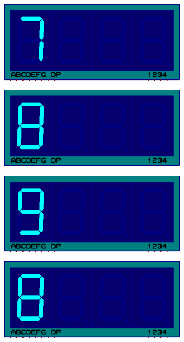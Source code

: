 \documentclass{lab_sheet}
\begin{document}
\begin{figure}[H]
\begin{subfigure}{.33\textwidth}
    \caption{}
    \label{fig:prob1-g}
  \end{subfigure}
  \begin{subfigure}{.33\textwidth}
    \centering
    \includegraphics[frame,width=.9\linewidth]{../Figures/s7}   
    \caption{}
    \label{fig:prob1-h}
  \end{subfigure}
  \begin{subfigure}{.33\textwidth}
    \centering
    \includegraphics[frame,width=.9\linewidth]{../Figures/s8}   
    \caption{}
    \label{fig:prob1-i}
  \end{subfigure}
  \newline
  \begin{subfigure}{.33\textwidth}
    \centering
    \includegraphics[frame,width=.9\linewidth]{../Figures/s9}   
    \caption{}
    \label{fig:prob1-j}
  \end{subfigure}
  \begin{subfigure}{.33\textwidth}
    \centering
    \includegraphics[frame,width=.9\linewidth]{../Figures/s8}   

\end{subfigure}
\end{figure}
\end{document}
